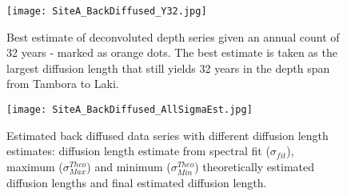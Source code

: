 \documentclass[../../CompleteThesis/Complete_1stDraft.tex]{subfiles}
\begin{document}
\begin{figure}
	\centering
	\texttt{[image: SiteA\_BackDiffused\_Y32.jpg]}
	\caption[Best estimate of deconvoluted depth series, Site A]{Best estimate of deconvoluted depth series given an annual count of 32 years - marked as orange dots. The best estimate is taken as the largest diffusion length that still yields 32 years in the depth span from Tambora to Laki.}
	\label{fig:SiteA_BackDiffused_Y32}
\end{figure}

\begin{figure}
	\centering
	\texttt{[image: SiteA\_BackDiffused\_AllSigmaEst.jpg]}
	\caption[All diffusion length estimate deconvolutions, Site A]{Estimated back diffused data series with different diffusion length estimates: diffusion length estimate from spectral fit ($\sigma_{fit}$), maximum ($\sigma_{Max}^{Theo}$) and minimum ($\sigma_{Min}^{Theo}$) theoretically estimated diffusion lengths and final estimated diffusion length.}
	\label{fig:SiteA_BackDiffused_AllSigmaEst}
\end{figure}
\end{document}
